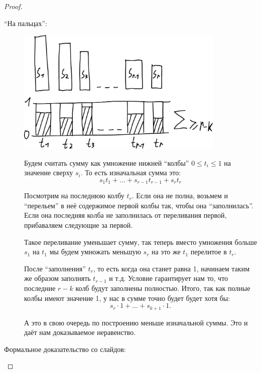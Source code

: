 \begin{proof}
    \begin{description}
        \item[``На пальцах'':] \mbox{}
        \begin{center}
            \includegraphics[height=6cm]{img/lecture31_drawing_1}
        \end{center}

        Будем считать сумму как умножение нижней ``колбы'' $0 \leq t_i \leq 1$ на значение сверху $s_i$. То есть изначальная сумма это:
        \begin{equation*}
            s_1 t_1 + \dots + s_{r-1} t_{r-1} + s_r t_r
        \end{equation*}

        Посмотрим на последнюю колбу $t_r$. Если она не полна, возьмем и ``перельем'' в неё содержимое первой колбы так, чтобы она ``заполнилась''. Если она последняя колба не заполнилась от переливания первой, прибаваляем следующие за первой.
        
        Такое переливание уменьшает сумму, так теперь вместо умножения больше $s_1$ на $t_1$ мы будем умножать меньшую $s_r$ на это же $t_1$ перелитое в $t_r$.

        После ``заполнения'' $t_r$, то есть когда она станет равна 1, начинаем таким же образом заполнять $t_{r-1}$ и т.д. Условие гарантирует нам то, что последние $r - k$ колб будут заполнены полностью. Итого, так как полные колбы имеют значение 1, у нас в сумме точно будет будет хотя бы:
        \begin{equation*}
            s_r \cdot 1 + \dots + s_{k+1} \cdot 1. 
        \end{equation*}

        А это в свою очередь по построению меньше изначальной суммы. Это и даёт нам доказываемое неравенство.
        \item[Формальное доказательство со слайдов:] \mbox{}
    

\end{description}
\end{proof}
